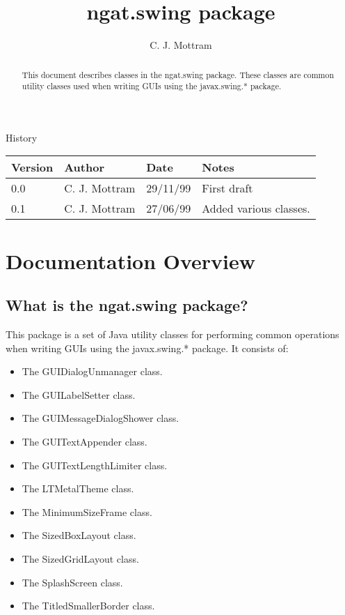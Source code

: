 \documentclass[10pt,a4paper]{article}
\title{ngat.swing package}
\author{C. J. Mottram}
\date{}
\begin{document}
\thispagestyle{empty}
\maketitle
\begin{abstract}
This document describes classes in the ngat.swing package.
These classes are common utility classes used when writing GUIs using the javax.swing.* package.
\end{abstract}

\centerline{\Large History}
\begin{center}
\begin{tabular}{|l|l|l|p{15em}|}
\hline
{\bf Version} & {\bf Author} & {\bf Date} & {\bf Notes} \\
\hline
0.0 &              C. J. Mottram & 29/11/99 & First draft \\
0.1 &              C. J. Mottram & 27/06/99 & Added various classes. \\
\hline
\end{tabular}
\end{center}

\newpage
\tableofcontents
\listoffigures
\listoftables
\newpage

\section{Documentation Overview}
\subsection{What is the ngat.swing package?}
This package is a set of Java utility classes for performing common operations
when writing GUIs using the javax.swing.* package.
It consists of:
\begin{itemize}
\item The GUIDialogUnmanager class.
\item The GUILabelSetter class.
\item The GUIMessageDialogShower class.
\item The GUITextAppender class.
\item The GUITextLengthLimiter class.
\item The LTMetalTheme class.
\item The MinimumSizeFrame class.
\item The SizedBoxLayout class.
\item The SizedGridLayout class.
\item The SplashScreen class.
\item The TitledSmallerBorder class.
\end{itemize}
\end{document}
